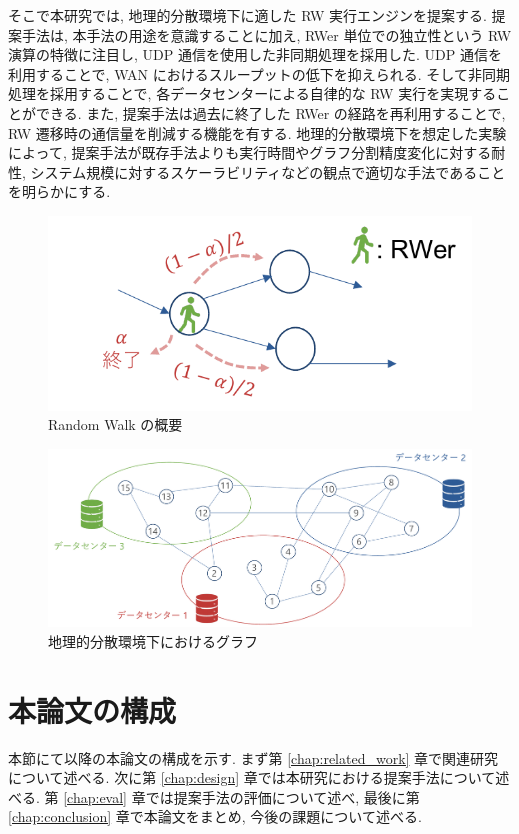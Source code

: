 そこで本研究では, 地理的分散環境下に適した RW 実行エンジンを提案する. 提案手法は, 本手法の用途を意識することに加え, RWer 単位での独立性という RW 演算の特徴に注目し, UDP 通信を使用した非同期処理を採用した. UDP 通信を利用することで, WAN におけるスループットの低下を抑えられる. そして非同期処理を採用することで, 各データセンターによる自律的な RW 実行を実現することができる. また, 提案手法は過去に終了した RWer の経路を再利用することで, RW 遷移時の通信量を削減する機能を有する. 地理的分散環境下を想定した実験によって, 提案手法が既存手法よりも実行時間やグラフ分割精度変化に対する耐性, システム規模に対するスケーラビリティなどの観点で適切な手法であることを明らかにする. 

\begin{figure}[t]
    \centering
    \includegraphics[scale=1.0]{figure/RandomWalk.pdf}
    \caption{Random Walk の概要}
    \label{Random Walk の概要}
\end{figure}

\begin{figure}[t]
    \centering
    \includegraphics[scale=0.5]{figure/dcgraph.pdf}
    \caption{地理的分散環境下におけるグラフ}
    \label{地理的分散環境下におけるグラフ}
\end{figure}

\section{本論文の構成}

本節にて以降の本論文の構成を示す. まず第 \ref{chap:related_work} 章で関連研究について述べる. 次に第 \ref{chap:design} 章では本研究における提案手法について述べる. 第 \ref{chap:eval} 章では提案手法の評価について述べ, 最後に第 \ref{chap:conclusion} 章で本論文をまとめ, 今後の課題について述べる. 